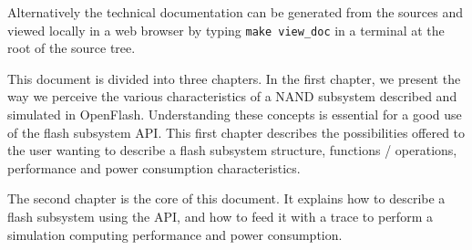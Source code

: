 Alternatively the technical documentation can be generated from the sources and viewed locally in a web browser by typing \verb+make view_doc+ in a terminal at the root of the source tree.

This document is divided into three chapters. In the first chapter, we present the way we perceive the various characteristics of a NAND subsystem described and simulated in OpenFlash. Understanding these concepts is essential for a good use of the flash subsystem API. This first chapter describes the possibilities offered to the user wanting to describe a flash subsystem structure, functions / operations, performance and power consumption characteristics.

The second chapter is the core of this document. It explains how to describe a flash subsystem using the API, and how to feed it with a trace to perform a simulation computing performance and power consumption. 
